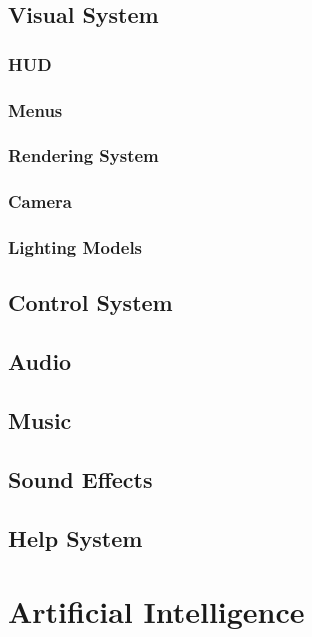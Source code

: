 \documentclass[12pt,titlepage]{article}
\begin{document}
\subsection{Visual System}

\subsubsection{HUD}

\subsubsection{Menus}

\subsubsection{Rendering System}

\subsubsection{Camera}

\subsubsection{Lighting Models}

\subsection{Control System}

\subsection{Audio}

\subsection{Music}

\subsection{Sound Effects}

\subsection{Help System}

\newpage
\section{Artificial Intelligence}
\end{document}
